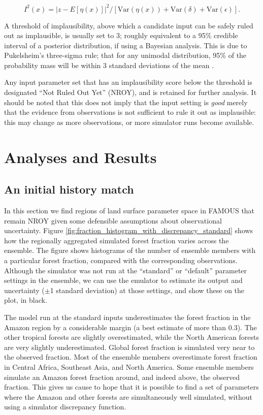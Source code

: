 \documentclass[esd, manuscript]{copernicus}
\begin{document}
\begin{equation}\label{eq:implausibility}
I^{2}(x)=  |z -E[\eta(x)]|^{2} / [\textrm{Var}(\eta(x)) +\textrm{Var}(\delta) +\textrm{Var}(\epsilon)].
\end{equation}

A threshold of implausibility, above which a candidate input can be safely ruled out as implausible, is usually set to 3; roughly equivalent to a 95\% credible interval of a posterior distribution, if using a Bayesian analysis. This is due to Pukelsheim's three-sigma rule; that for any unimodal distribution, 95\% of the probability mass will be within 3 standard deviations of the mean \citep{pukelsheim1994three}.

Any input parameter set that has an implausibility score below the threshold is designated ``Not Ruled Out Yet'' (NROY), and is retained for further analysis. It should be noted that this does not imply that the input setting is \emph{good} merely that the evidence from observations is not sufficient to rule it out as implausible: this may change as more observations, or more simulator runs become available.

\section{Analyses and Results}\label{AnalysesandResults}

\subsection{An initial history match}\label{ssec:initialhistorymatch}
In this section we find regions of land surface parameter space in FAMOUS that remain NROY given some defensible assumptions about observational uncertainty.  Figure \ref{fig:fraction_histogram_with_discrepancy_standard} shows how the regionally aggregated simulated forest fraction varies across the ensemble. The figure shows histograms of the number of ensemble members with a particular forest fraction, compared with the corresponding observations. Although the simulator was not run at the ``standard'' or ``default'' parameter settings in the ensemble, we can use the emulator to estimate its output and uncertainty ($\pm$1 standard deviation) at those settings, and show these on the plot, in black.

The model run at the standard inputs underestimates the forest fraction in the Amazon region by a considerable margin (a best estimate of more than 0.3). The other tropical forests are slightly overestimated, while the North American forests are very slightly underestimated. Global forest fraction is simulated very near to the observed fraction. Most of the ensemble members overestimate forest fraction in Central Africa, Southeast Asia, and North America. Some ensemble members simulate an Amazon forest fraction around, and indeed above, the observed fraction. This gives us cause to hope that it is possible to find a set of parameters where the Amazon and other forests are simultaneously well simulated, without using a simulator discrepancy function. 
\end{document}

